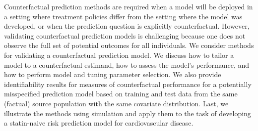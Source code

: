 


Counterfactual prediction methods are required when a model will be deployed in a setting where treatment policies differ from the setting where the model was developed, or when the prediction question is explicitly counterfactual. However, validating counterfactual prediction models is challenging because one does not observe the full set of potential outcomes for all individuals. We consider methods for validating a counterfactual prediction model. We discuss how to tailor a model to a counterfactual estimand, how to assess the model's performance, and how to perform model and tuning parameter selection. We also provide identifiability results for measures of counterfactual performance for a potentially misspecified prediction model based on training and test data from the same (factual) source population with the same covariate distribution. Last, we illustrate the methods using simulation and apply them to the task of developing a statin-naive risk prediction model for cardiovascular disease. \\
